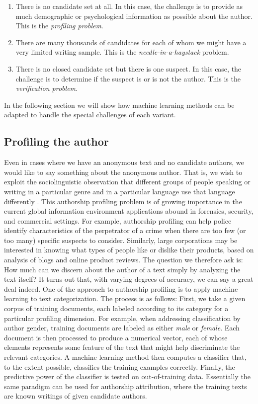 \begin{enumerate}
	\item There is no candidate set at all. In this case, the challenge is to provide as much demographic or psychological information as possible about the author. This is the \textit{profiling problem}.
	\item There are many thousands of candidates for each of whom we might have a very limited writing sample. This is the \textit{needle-in-a-haystack} problem.
	\item There is no closed candidate set but there is one suspect. In this case, the challenge is to determine if the suspect is or is not the author. This is the \textit{verification problem}.
\end{enumerate}

In the following section we will show how machine learning methods can be adapted to handle the special challenges of each variant.

\subsection{Profiling the author}
Even in cases where we have an anonymous text and no candidate authors, we would like to say something about the anonymous author. That is, we wish to exploit the sociolinguistic observation that different groups of people speaking or writing in a particular genre and in a particular language use that language differently \cite{chambers2004handbook}.
This authorship profiling problem is of growing importance in the current global information environment applications abound in forensics, security, and commercial settings. For example, authorship profiling can help police identify characteristics of the perpetrator of a crime when there are too few (or too many) specific suspects to consider. Similarly, large corporations may be interested in knowing what types of people like or dislike their products, based on analysis of blogs and online product reviews. The question we therefore ask is: How much can we discern about the author of a text simply by analyzing the text itself? It turns out that, with varying degrees of accuracy, we can say a great deal indeed.
One of the approach to authorship profiling is to apply machine learning to text categorization. The process is as follows: First, we take a given corpus of training documents, each labeled according to its category for a particular profiling dimension. For example, when addressing classification by author gender, training documents are labeled as either \textit{male} or \textit{female}. Each document is then processed to produce a numerical vector, each of whose elements represents some feature of the text that might help discriminate the relevant categories. A machine learning method then computes a classifier that, to the extent possible, classifies the training examples correctly. Finally, the predictive power of the classifier is tested on out-of-training data.
Essentially the same paradigm can be used for authorship attribution, where the training texts are known writings of given candidate authors.\cite{juola2008authorship}

